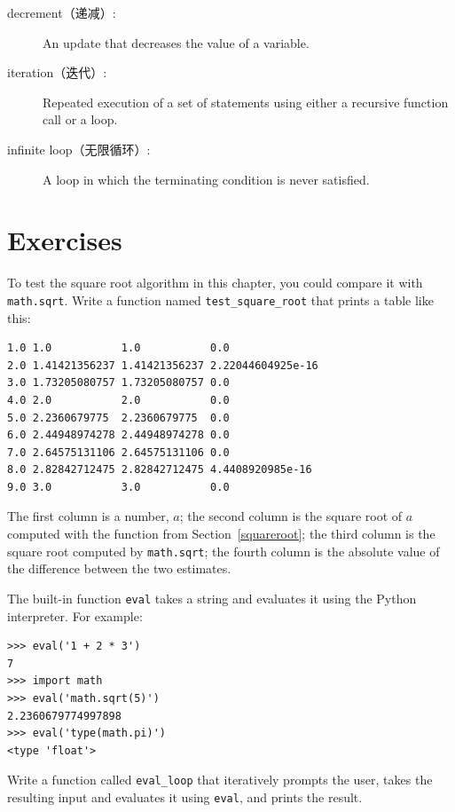 \documentclass[10pt]{book}
\begin{document}
\begin{CJK}{UTF8}{gbsn}
\begin{description}
\item[decrement（递减）:] An update that decreases the value of a variable.

\item[iteration（迭代）:] Repeated execution of a set of statements using
either a recursive function call or a loop.

\item[infinite loop（无限循环）:] A loop in which the terminating condition is
never satisfied.

\end{description}


\section{Exercises}

\begin{exercise}

To test the square root algorithm in this chapter, you could compare
it with {\tt math.sqrt}.  Write a function named \verb"test_square_root"
that prints a table like this:

\begin{verbatim}
1.0 1.0           1.0           0.0
2.0 1.41421356237 1.41421356237 2.22044604925e-16
3.0 1.73205080757 1.73205080757 0.0
4.0 2.0           2.0           0.0
5.0 2.2360679775  2.2360679775  0.0
6.0 2.44948974278 2.44948974278 0.0
7.0 2.64575131106 2.64575131106 0.0
8.0 2.82842712475 2.82842712475 4.4408920985e-16
9.0 3.0           3.0           0.0

\end{verbatim}
%
The first column is a number, $a$; the second column is
the square root of $a$ computed with the function from
Section~\ref{squareroot}; the third column is the square root computed
by {\tt math.sqrt}; the fourth column is the absolute value
of the difference between the two estimates.
\end{exercise}


\begin{exercise}

The built-in function {\tt eval} takes a string and evaluates
it using the Python interpreter.  For example:

\begin{verbatim}
>>> eval('1 + 2 * 3')
7
>>> import math
>>> eval('math.sqrt(5)')
2.2360679774997898
>>> eval('type(math.pi)')
<type 'float'>
\end{verbatim}
%
Write a function called \verb"eval_loop" that iteratively
prompts the user, takes the resulting input and evaluates
it using {\tt eval}, and prints the result.


\end{exercise}
\end{CJK}
\end{document}
